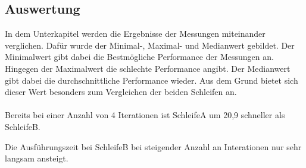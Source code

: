 \documentclass{article}
\begin{document}
    \subsection{Auswertung}
    In dem Unterkapitel werden die Ergebnisse der Messungen miteinander verglichen.
    Dafür wurde der Minimal-, Maximal- und Medianwert gebildet.
    Der Minimalwert gibt dabei die Bestmögliche Performance der Messungen an.
    Hingegen der Maximalwert die schlechte Performance angibt.
    Der Medianwert gibt dabei die durchschnittliche Performance wieder.
    Aus dem Grund bietet sich dieser Wert besonders zum Vergleichen der beiden Schleifen an.\\
    \\
    Bereits bei einer Anzahl von 4 Iterationen ist SchleifeA um 20,9 schneller als SchleifeB.
    
    Die Ausführungszeit bei SchleifeB bei steigender Anzahl an Interationen nur sehr langsam ansteigt.

    \newpage
\end{document}
